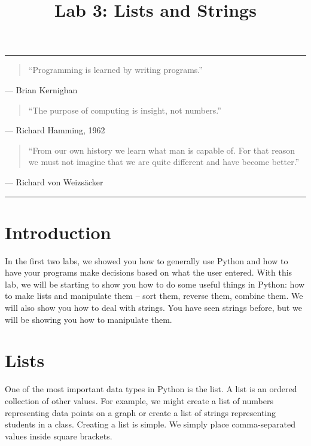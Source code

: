 \documentclass[11pt]{cselabheader}
\title{Lab 3: Lists and Strings}
\begin{document}
\maketitle

\hrule

\begin{quotation}
``Programming is learned by writing programs.''
\end{quotation}
\begin{flushright}
--- Brian Kernighan
\end{flushright}

\begin{quotation}
``The purpose of computing is insight, not numbers.''
\end{quotation}
\begin{flushright}
--- Richard Hamming, 1962
\end{flushright}

\begin{quotation}
  ``From our own history we learn what man is capable of. For that reason we
  must not imagine that we are quite different and have become better.''
\end{quotation}
\begin{flushright}
	--- Richard von Weizs\"{a}cker
\end{flushright}
\hrule

\section{Introduction}
In the first two labs, we showed you how to generally use Python and how to
have your programs make decisions based on what the user entered. With this
lab, we will be starting to show you how to do some useful things in Python:
how to make lists and manipulate them -- sort them, reverse them, combine them.
We will also show you how to deal with strings. You have
seen strings before, but we will be showing you how to manipulate them.

\pagebreak
\section{Lists}
One of the most important data types in Python is the list. A list is an ordered
collection of other values. For example, we might create a list of numbers
representing data points on a graph or create a list of strings representing
students in a class. Creating a list is simple. We simply place comma-separated
values inside square brackets.
\end{document}
